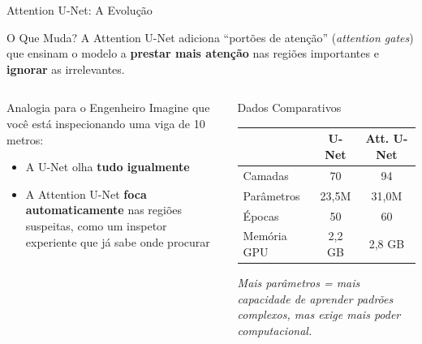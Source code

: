 \documentclass[aspectratio=169, 12pt]{beamer}
\begin{document}
\begin{frame}{Attention U-Net: A Evolução}
    \begin{block}{O Que Muda?}
        A Attention U-Net adiciona ``portões de atenção'' (\textit{attention gates}) que ensinam o modelo a \textbf{prestar mais atenção} nas regiões importantes e \textbf{ignorar} as irrelevantes.
    \end{block}

    \vspace{0.3cm}

    \begin{columns}[T]
        \begin{exampleblock}{Analogia para o Engenheiro}
            Imagine que você está inspecionando uma viga de 10 metros:
            \begin{itemize}
                \item A U-Net olha \textbf{tudo igualmente}
                \item A Attention U-Net \textbf{foca automaticamente} nas regiões suspeitas, como um inspetor experiente que já sabe onde procurar
            \end{itemize}
        \end{exampleblock}

        \begin{block}{Dados Comparativos}
            \begin{tabular}{lcc}
                \toprule
                & \textbf{U-Net} & \textbf{Att. U-Net} \\
                \midrule
                Camadas & 70 & 94 \\
                Parâmetros & 23,5M & 31,0M \\
                Épocas & 50 & 60 \\
                Memória GPU & 2,2 GB & 2,8 GB \\
                \bottomrule
            \end{tabular}

            \vspace{0.3cm}

            {\scriptsize \textit{Mais parâmetros = mais capacidade de aprender padrões complexos, mas exige mais poder computacional.}}
        \end{block}
    \end{columns}
\end{frame}
\end{document}
